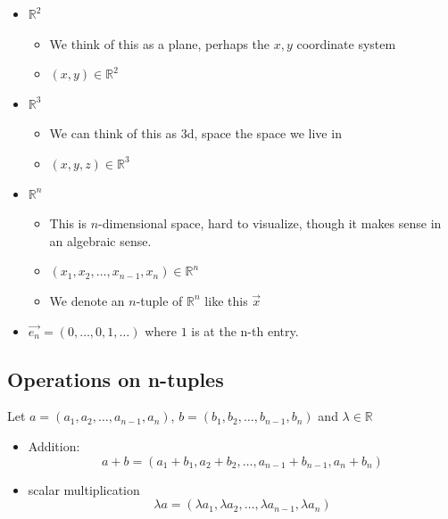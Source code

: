 \documentclass[11pt]{book}
\begin{document}
\begin{itemize}
    \item $\mathbb{R} ^{2} $ 
        \begin{itemize}
            \item We think of this as a plane, perhaps the $x, y$ coordinate system
            \item $\left( x,y \right) \in \mathbb{R} ^2 $ 
        \end{itemize}
    \item $\mathbb{R} ^{3} $ 
        \begin{itemize}
            \item We can think of this as 3d, space the space we live in
            \item $\left( x,y,z \right) \in  \mathbb{R} ^{3}  $ 
        \end{itemize}
    \item $\mathbb{R} ^{n} $ 
        \begin{itemize}
            \item This is $n$-dimensional space, hard to visualize, though it makes sense in an algebraic sense.
            \item $\left( x_{1} , x_{2} , \dotsc  , x_{n - 1} , x_{n}  \right) \in \mathbb{R} ^{n} $ 
            \item We denote an $n$-tuple of $\mathbb{R} ^{n} $ like this $\vec{x} $  
        \end{itemize}
    \item $\vec{e_{n} } = \left( 0, \ldots , 0, 1, \ldots  \right) $ where $1$ is at the n-th entry.
\end{itemize}

\subsection{Operations on n-tuples}%
\label{sub:operations_on_n_tuples}

Let $a = \left( a_{1} , a_{2} , \dotsc  , a_{n - 1} , a_{n}  \right) $, $b = \left( b_{1} , b_{2} , \dotsc  , b_{n - 1} , b_{n}  \right) $ and $\lambda \in \mathbb{R} $ 

\begin{itemize}
    \item Addition:
       \[
           a + b = \left( a_{1} + b_{1} , a_{2} + b_{2} , \dotsc  , a_{n - 1} + b_{n - 1} , a_{n} + b_{n}  \right) 
       \]
    \item scalar multiplication 
        \[
            \lambda a = \left( \lambda a_{1} , \lambda a_{2} , \dotsc  , \lambda a_{n - 1} , \lambda a_{n}  \right) 
        \]
\end{itemize}
\end{document}
